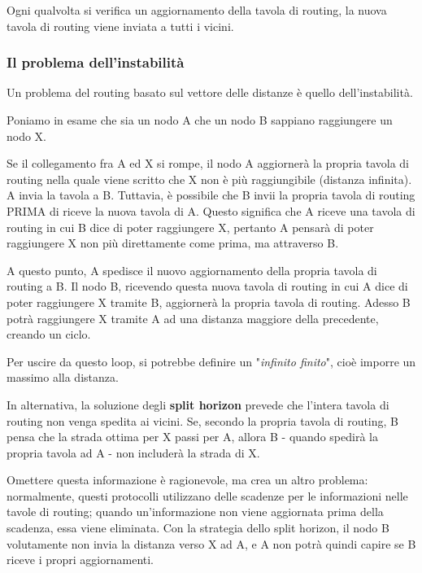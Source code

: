         Ogni qualvolta si verifica un aggiornamento della tavola di routing, la nuova tavola di routing viene inviata a tutti i vicini.
        
        \subsubsection{Il problema dell'instabilità}
        
            Un problema del routing basato sul vettore delle distanze è quello dell'instabilità.
            
            Poniamo in esame che sia un nodo A che un nodo B sappiano raggiungere un nodo X.
            
            Se il collegamento fra A ed X si rompe, il nodo A aggiornerà la propria tavola di routing nella quale viene scritto che X non è più raggiungibile (distanza infinita). A invia la tavola a B. Tuttavia, è possibile che B invii la propria tavola di routing PRIMA di riceve la nuova tavola di A. Questo significa che A riceve una tavola di routing in cui B dice di poter raggiungere X, pertanto A pensarà di poter raggiungere X non più direttamente come prima, ma attraverso B.
            
            A questo punto, A spedisce il nuovo aggiornamento della propria tavola di routing a B. Il nodo B, ricevendo questa nuova tavola di routing in cui A dice di poter raggiungere X tramite B, aggiornerà la propria tavola di routing. Adesso B potrà raggiungere X tramite A ad una distanza maggiore della precedente, creando un ciclo.
            
            \vspace{3mm}
            
            Per uscire da questo loop, si potrebbe definire un "\textit{infinito finito}", cioè imporre un massimo alla distanza. 
            
            In alternativa, la soluzione degli \textbf{split horizon} prevede che l'intera tavola di routing non venga spedita ai vicini. Se, secondo la propria tavola di routing, B pensa che la strada ottima per X passi per A, allora B - quando spedirà la propria tavola ad A - non includerà la strada di X. 
            
            Omettere questa informazione è ragionevole, ma crea un altro problema: normalmente, questi protocolli utilizzano delle scadenze per le informazioni nelle tavole di routing; quando un'informazione non viene aggiornata prima della scadenza, essa viene eliminata. Con la strategia dello split horizon, il nodo B volutamente non invia la distanza verso X ad A, e A non potrà quindi capire se B riceve i propri aggiornamenti.
            
